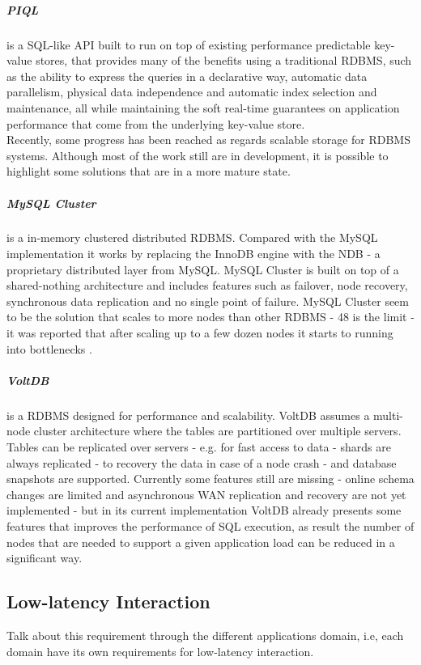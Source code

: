 \subparagraph{\gls{PIQL}} \cite{armbrust2010piql} is a SQL-like API
built to run on top of existing performance predictable key-value stores, that provides many of the benefits
using a traditional \gls{RDBMS}, such as the ability to express the queries in a declarative way, automatic
data parallelism, physical data independence and automatic index selection and maintenance, all while
maintaining the soft real-time guarantees on application performance that come from the underlying
key-value store.\\

Recently, some progress has been reached as regards scalable storage for \gls{RDBMS} systems. Although
most of the work still are in development, it is possible to highlight some solutions that are in a more
mature state.

\subparagraph{MySQL Cluster} \cite{ronstrom2004mysql} is a in-memory clustered distributed \gls{RDBMS}. Compared with
the MySQL implementation it works by replacing the InnoDB engine with the NDB - a proprietary
distributed layer from MySQL. MySQL Cluster is built on top of a shared-nothing architecture and includes
features such as failover, node recovery, synchronous data replication and no single point of failure.
MySQL Cluster seem to be the solution that scales to more nodes than other \gls{RDBMS} - 48 is the limit -
it was reported that after scaling up to a few dozen nodes it starts to running into bottlenecks \cite{bunch2010evaluation}.

\subparagraph{VoltDB} \cite{stonebraker2013voltdb} is a \gls{RDBMS} designed for performance and scalability. VoltDB
assumes a multi-node cluster architecture where the tables are partitioned over multiple servers. Tables
can be replicated over servers - e.g. for fast access to data - shards are always replicated -
to recovery the data in case of a node crash - and database snapshots are supported. Currently some
features still are missing - online schema changes are limited and asynchronous WAN replication and
recovery are not yet implemented - but in its current implementation VoltDB already presents some
features that improves the performance of SQL execution, as result the number of nodes that are needed
to support a given application load can be reduced in a significant way.

\subsection{Low-latency Interaction}
\label{sub:low_latency_interaction}
Talk about this requirement through the different applications domain, i.e, each domain have its own
requirements for low-latency interaction.
